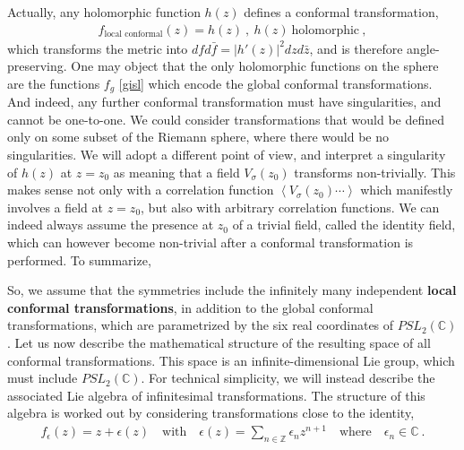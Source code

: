 \documentclass[12pt, a4paper, notitlepage, twoside]{report}
\numberwithin{equation}{section}
\theoremstyle{break}
\begin{document}
Actually, any holomorphic function $h(z)$ defines a conformal transformation,
\begin{align}
 f_\text{local conformal}(z) = h(z) \ , \ h(z)\ \text{holomorphic}\ , 
\label{flc}
\end{align}
which transforms the metric into $dfd\bar{f} = |h'(z)|^2 dzd\bar{z}$, and is therefore angle-preserving.
One may object that the only holomorphic functions on the sphere are the functions $f_g$ \eqref{gisl} which encode the global conformal transformations.
And indeed, any further conformal transformation must have singularities, and cannot be one-to-one.
We could consider transformations that would be defined only on some subset of the Riemann sphere, where there would be no singularities.
We will adopt a different point of view, and interpret a singularity of $h(z)$ at $z=z_0$ as meaning that a field $V_\sigma(z_0)$ transforms non-trivially.
This makes sense not only with a correlation function $\left\langle V_{\sigma}(z_0)\cdots \right\rangle $ which manifestly involves a field at $z=z_0$, 
but also with arbitrary correlation functions.
We can indeed always assume the presence at $z_0$ of a trivial field, called the identity field, which can however become non-trivial after a conformal transformation is performed.
To summarize,
\begin{center}
\end{center}
So, we assume that the symmetries include the infinitely many independent \textbf{\boldmath local conformal transformations}, in addition to the global conformal transformations, which are parametrized by the six real coordinates of $PSL_2({\mathbb{C}})$.
Let us now describe the mathematical structure of the resulting space of all conformal transformations.
This space is an infinite-dimensional Lie group, which must include $PSL_2({\mathbb{C}})$.
For technical simplicity, we will instead describe the associated Lie algebra of infinitesimal transformations.
The structure of this algebra is worked out by considering transformations close to the identity, 
\begin{align}
 f_{\epsilon}(z) = z + \epsilon(z) \quad \text{with} \quad \epsilon(z) = \sum_{n\in{\mathbb{Z}}} \epsilon_n z^{n+1} \quad 
 \text{where} \quad \epsilon_n\in\mathbb{C}\ .
\label{sen}
\end{align}
\end{document}
